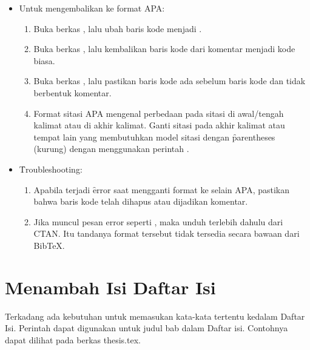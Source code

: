 \begin{itemize}
\begin{enumerate}
	\end{enumerate}
	\item Untuk mengembalikan ke format APA:
	\begin{enumerate}
		\item Buka berkas , lalu ubah baris kode  menjadi .
		\item Buka berkas , lalu kembalikan baris kode  dari komentar menjadi kode biasa.
		\item Buka berkas , lalu pastikan baris kode  ada sebelum baris kode  dan tidak berbentuk komentar.
		\item Format sitasi APA mengenal perbedaan pada sitasi di awal/tengah kalimat atau di akhir kalimat. Ganti sitasi pada akhir kalimat atau tempat lain yang membutuhkan model sitasi dengan \f{parentheses} (kurung) dengan menggunakan perintah .
	\end{enumerate}
	\item \f{Troubleshooting}:
	\begin{enumerate}
		\item Apabila terjadi \f{error} saat mengganti format ke selain APA, pastikan bahwa baris kode  telah dihapus atau dijadikan komentar.
		\item Jika muncul pesan error seperti , maka unduh terlebih dahulu dari CTAN. Itu tandanya format tersebut tidak tersedia secara bawaan dari BibTeX.
	\end{enumerate}
\end{itemize}


\section{Menambah Isi Daftar Isi}
\label{sec:tableOfContent}
Terkadang ada kebutuhan untuk memasukan kata-kata tertentu kedalam Daftar Isi.
Perintah  dapat digunakan untuk judul bab dalam Daftar isi.
Contohnya dapat dilihat pada berkas thesis.tex.


